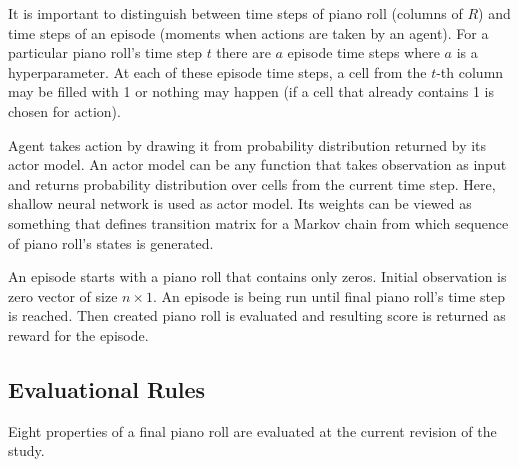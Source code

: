 \documentclass{article}
\begin{document}
It is important to distinguish between time steps of piano roll (columns of $R$) and time steps of an episode (moments when actions are taken by an agent). For a particular piano roll's time step $t$ there are $a$ episode time steps where $a$ is a hyperparameter. At each of these episode time steps, a cell from the $t$-th column may be filled with 1 or nothing may happen (if a cell that already contains 1 is chosen for action).

Agent takes action by drawing it from probability distribution returned by its actor model. An actor model can be any function that takes observation as input and returns probability distribution over cells from the current time step. Here, shallow neural network is used as actor model. Its weights can be viewed as something that defines transition matrix for a Markov chain from which sequence of piano roll's states is generated.

An episode starts with a piano roll that contains only zeros. Initial observation is zero vector of size $n \times 1$. An episode is being run until final piano roll's time step is reached. Then created piano roll is evaluated and resulting score is returned as reward for the episode.

\subsection{Evaluational Rules}
\label{subsec:setup}

Eight properties of a final piano roll are evaluated at the current revision of the study.
\end{document}
